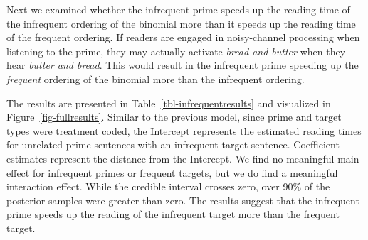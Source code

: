 \documentclass[
  12pt,
]{scrartcl}
\begin{document}
Next we examined whether the infrequent prime speeds up the reading time
of the infrequent ordering of the binomial more than it speeds up the
reading time of the frequent ordering. If readers are engaged in
noisy-channel processing when listening to the prime, they may actually
activate \emph{bread and butter} when they hear \emph{butter and bread}.
This would result in the infrequent prime speeding up the
\emph{frequent} ordering of the binomial more than the infrequent
ordering.

The results are presented in Table~\ref{tbl-infrequentresults} and
visualized in Figure~\ref{fig-fullresults}. Similar to the previous
model, since prime and target types were treatment coded, the Intercept
represents the estimated reading times for unrelated prime sentences
with an infrequent target sentence. Coefficient estimates represent the
distance from the Intercept. We find no meaningful main-effect for
infrequent primes or frequent targets, but we do find a meaningful
interaction effect. While the credible interval crosses zero, over 90\%
of the posterior samples were greater than zero. The results suggest
that the infrequent prime speeds up the reading of the infrequent target
more than the frequent target.

\begin{table}

\caption{\label{tbl-infrequentresults}Results of the statistical model
for the infrequent vs unrelated prime.}


\end{table}%
\end{document}
